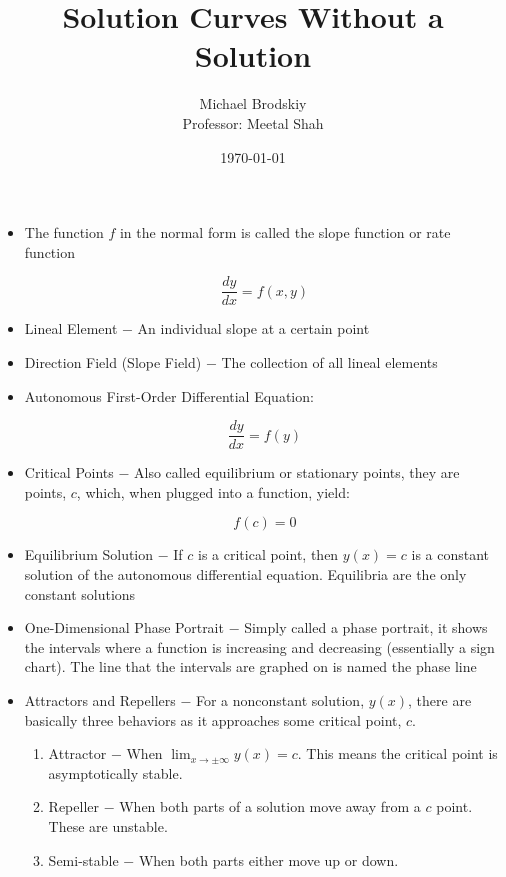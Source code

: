 \documentclass[12pt]{article}
\title{Solution Curves Without a Solution}
\date{\today}
\author{Michael Brodskiy\\ \small Professor: Meetal Shah}
\begin{document}
\maketitle

\begin{itemize}

  \item The function $f$ in the normal form is called the slope function or rate function 

    $$\frac{dy}{dx}=f(x,y)$$

  \item Lineal Element $-$ An individual slope at a certain point

  \item Direction Field (Slope Field) $-$ The collection of all lineal elements

  \item Autonomous First-Order Differential Equation:

    $$\frac{dy}{dx}=f(y)$$

  \item Critical Points $-$ Also called equilibrium or stationary points, they are points, $c$, which, when plugged into a function, yield:

    $$f(c)=0$$

  \item Equilibrium Solution $-$ If $c$ is a critical point, then $y(x)=c$ is a constant solution of the autonomous differential equation. Equilibria are the only constant solutions

  \item One-Dimensional Phase Portrait $-$ Simply called a phase portrait, it shows the intervals where a function is increasing and decreasing (essentially a sign chart). The line that the intervals are graphed on is named the phase line

  \item Attractors and Repellers $-$ For a nonconstant solution, $y(x)$, there are basically three behaviors as it approaches some critical point, $c$. 
    
    \begin{enumerate}

      \item Attractor $-$ When $\lim_{x\to\pm\infty}y(x)=c$. This means the critical point is asymptotically stable.

      \item Repeller $-$ When both parts of a solution move away from a $c$ point. These are unstable.

      \item Semi-stable $-$ When both parts either move up or down.

    \end{enumerate}

\end{itemize}
\end{document}
